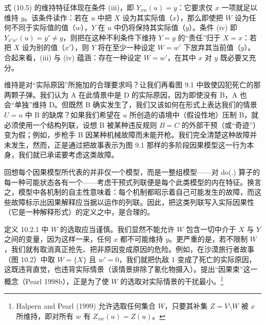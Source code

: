 式 \textup{(10.5)} 的维持特征体现在条件 (iii)，即 $Y_{xw}(u)=y$：它要求仅 $x$ 一项就足以维持 $y$。该条件读作：若在 $u$ 中把 $X$ 设为其实际值（$x$），那么即使把 $W$ 设为任何不同于实际值的值（$w$），$Y$ 在 $u$ 中仍将保持其实际值（$y$）。条件 (iv) 即 $Y_{x'w'}(u)=y'\neq y$，则把在这种不利条件下维持 $Y=y$ 的“责任”归于 $X=x$：若把 $X$ 设为别的值（$x'$），则 $Y$ 将在至少一种设定 $W=w'$ 下放弃其当前值（$y$）。合起来看，(iii) 与 (iv) 蕴涵：存在一种设定 $W=w'$，在其中 $x$ 对 $y$ 既必要又充分。

维持是对“实际原因”所施加的合理要求吗？让我们再看图 9.1 中致使囚犯死亡的那两颗子弹。我们认为 A 在此情景中是 D 的实际原因，因为即使没有 B，A 也会“单独”维持 D。但既然 B 确实发生了，我们又该如何在形式上表达我们的情景 $U=u$ 中 B 的缺席？如果我们希望在 $u$ 所创造的语境中（假设性地）压制 B，就必须使用一个结构列联，设想 B 被某种违反规则 $B=C$ 的外部干预（或“奇迹”）变为假；例如，步枪手 B 因某种机械故障而未能开枪。我们完全清楚这种故障并未发生，然而，正是通过把故事表示为图 9.1 那样的多阶段因果模型这一行为本身，我们就已承诺要考虑这类故障。

回想每个因果模型所代表的并非仅一个模型，而是一整组模型——对 do(.) 算子的每一种可能状态各有一个——考虑干预式列联便是每个此类模型的内在特征。换言之，模型中各机制的自主性意味着：每个机制都昭示着自己可能发生的故障，而这些故障标示出因果解释应当据以运作的列联。因此，把这类列联写入实际因果性（它是一种解释形式）的定义之中，是合理的。

定义 10.2.1 中 $W$ 的选取应当谨慎。我们显然不能允许 $W$ 包含一切中介于 $X$ 与 $Y$ 之间的变量，因为这样一来，任何 $x$ 都不可能维持 $y$。更严重的是，若不限制 $W$，我们就有取消真正抢先、把非原因变成原因的危险。例如，在沙漠旅行者故事（图 10.2）中取 $W=\{X\}$ 且 $w'=0$，我们就把仇敌 1 变成了死亡的实际原因，这既违背直觉，也违背实际情景（该情景排除了氰化物摄入）。提出“因果束”这一概念（Pearl 1998b），正是为了使 $W$ 的选取对实际情景的干扰最小。\footnote{Halpern and Pearl (1999) 允许选取任何集合 $W$，只要其补集 $Z=V\setminus W$ 被 $x$ 所维持，即对所有 $w$ 有 $Z_{xw}(u)=Z(u)$。}
